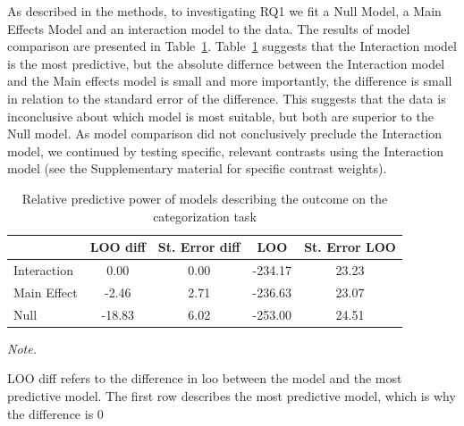 \documentclass[
  man]{apa7}
\begin{document}
As described in the methods, to investigating RQ1 we fit a Null Model, a Main Effects Model and an interaction model to the data. The results of model comparison are presented in Table~\ref{tab:loo}.
Table~\ref{tab:loo} suggests that the Interaction model is the most predictive, but the absolute differnce between the Interaction model and the Main effects model is small and more importantly, the difference is small in relation to the standard error of the difference. This suggests that the data is inconclusive about which model is most suitable, but both are superior to the Null model. As model comparison did not conclusively preclude the Interaction model, we continued by testing specific, relevant contrasts using the Interaction model (see the Supplementary material for specific contrast weights).

\begin{table}

\caption{\label{tab:loo}Relative predictive power of models describing the outcome on the categorization task}
\centering
\begin{threeparttable}
\begin{tabular}[t]{lcccc}
\toprule
  & LOO diff & St. Error diff & LOO & St. Error LOO\\
\midrule
Interaction & 0.00 & 0.00 & -234.17 & 23.23\\
Main Effect & -2.46 & 2.71 & -236.63 & 23.07\\
Null & -18.83 & 6.02 & -253.00 & 24.51\\
\bottomrule
\end{tabular}
\begin{tablenotes}[para]
\item \textit{Note.} 
\item LOO diff refers to the difference in loo between the model and the most predictive model. The first row describes the most predictive model, which is why the difference is 0
\end{tablenotes}
\end{threeparttable}
\end{table}
\end{document}

